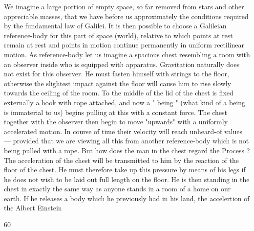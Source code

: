 \documentclass{article}
\begin{document}
We imagine a large portion of empty space, so far removed from stars and other
appreciable masses, that we have before us approximately the conditions required by the
fundamental law of Galilei. It is then possible to choose a Galileian reference-body for this
part of space (world), relative to which points at rest remain at rest and points in motion
continue permanently in uniform rectilinear motion. As reference-body let us imagine a
spacious chest resembling a room with an observer inside who is equipped with apparatus.
Gravitation naturally does not exist for this observer. He must fasten himself with strings to
the floor, otherwise the slightest impact against the floor will cause him to rise slowly
towards the ceiling of the room.
To the middle of the lid of the chest is fixed externally a hook with rope attached, and
now a " being " (what kind of a being is immaterial to us) begins pulling at this with a
constant force. The chest together with the observer then begin to move "upwards" with a
uniformly accelerated motion. In course of time their velocity will reach unheard-of values
— provided that we are viewing all this from another reference-body which is not being
pulled with a rope.
But how does the man in the chest regard the Process ? The acceleration of the chest will
be transmitted to him by the reaction of the floor of the chest. He must therefore take up this
pressure by means of his legs if he does not wish to be laid out full length on the floor. He is
then standing in the chest in exactly the same way as anyone stands in a room of a home on
our earth. If he releases a body which he previously had in his land, the accelertion of the
Albert Einstein

60
\end{document}
